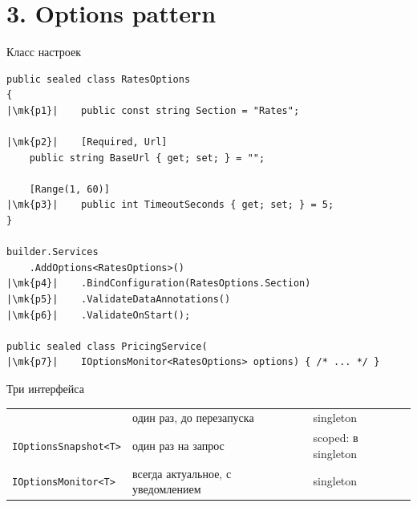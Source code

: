 \documentclass[aspectratio=169,10pt,t]{beamer}
\newcommand{\codexxs}{\ttfamily\fontsize{6.8}{7.8}\selectfont}
\newcommand{\mk}[1]{\tikz[remember picture,overlay]\coordinate (#1) at (0,0.55ex);}
\begin{document}
\section{3. Options pattern}

\begin{frame}[plain]
\end{frame}

\begin{frame}[fragile]{Класс настроек}
  \vspace{0.3em}
\begin{lstlisting}[style=csharp,basicstyle=\codexxs,escapechar=|]
public sealed class RatesOptions
{
|\mk{p1}|    public const string Section = "Rates";

|\mk{p2}|    [Required, Url]
    public string BaseUrl { get; set; } = "";

    [Range(1, 60)]
|\mk{p3}|    public int TimeoutSeconds { get; set; } = 5;
}

builder.Services
    .AddOptions<RatesOptions>()
|\mk{p4}|    .BindConfiguration(RatesOptions.Section)
|\mk{p5}|    .ValidateDataAnnotations()
|\mk{p6}|    .ValidateOnStart();

public sealed class PricingService(
|\mk{p7}|    IOptionsMonitor<RatesOptions> options) { /* ... */ }
\end{lstlisting}
\end{frame}

\begin{frame}{Три интерфейса}
  \slidetop

  {\renewcommand{\arraystretch}{1.6}
  \begin{tabular}{@{}L{4.2cm}L{5.0cm}L{3.6cm}@{}}
         & один раз, до перезапуска        & singleton \\
    \texttt{IOptionsSnapshot<T>}  & один раз на запрос              & scoped: в
      singleton  \\
    \texttt{IOptionsMonitor<T>}   & всегда актуальное, с уведомлением & singleton \\
  \end{tabular}}

  \slidegap
\end{frame}
\end{document}
